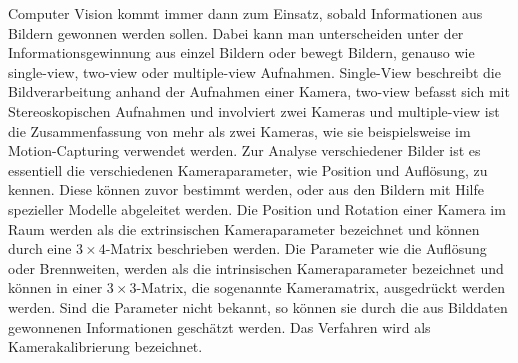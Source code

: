 Computer Vision kommt immer dann zum Einsatz, sobald Informationen aus Bildern gewonnen werden sollen. Dabei kann man unterscheiden unter der Informationsgewinnung aus einzel Bildern oder bewegt Bildern, genauso wie single-view, two-view oder multiple-view Aufnahmen. Single-View beschreibt die Bildverarbeitung anhand der Aufnahmen einer Kamera, two-view befasst sich mit Stereoskopischen Aufnahmen und involviert zwei Kameras und multiple-view ist die Zusammenfassung von mehr als zwei Kameras, wie sie beispielsweise im Motion-Capturing verwendet werden\cite{HZ}. %
Zur Analyse verschiedener Bilder ist es essentiell die verschiedenen Kameraparameter, wie Position und Auflösung, zu kennen. Diese können zuvor bestimmt werden, oder aus den Bildern mit Hilfe spezieller Modelle abgeleitet werden. Die Position und Rotation einer Kamera im Raum werden als die extrinsischen Kameraparameter bezeichnet und können durch eine $3\times4$-Matrix beschrieben werden. Die Parameter wie die Auflösung oder Brennweiten, werden als die intrinsischen Kameraparameter bezeichnet und können in einer $3 \times 3$-Matrix, die sogenannte Kameramatrix, ausgedrückt werden werden. Sind die Parameter nicht bekannt, so können sie durch die aus Bilddaten gewonnenen Informationen geschätzt werden. Das Verfahren wird als Kamerakalibrierung bezeichnet\cite{HZ,Ferid,Elements,ZZGXr}.

